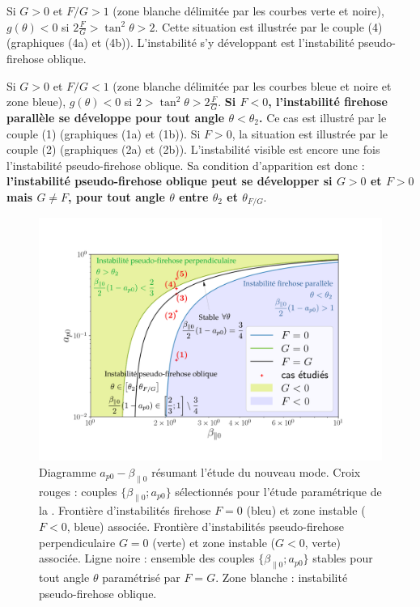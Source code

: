 Si $G>0$ et $F/G>1$ (zone blanche délimitée par les courbes verte et noire), $g(\theta) < 0$ si $2\frac{F}{G} > \tan^2 \theta > 2$. Cette situation est illustrée par le couple (4) (graphiques (4a) et (4b)). L'instabilité s'y développant est l'instabilité pseudo-firehose oblique. 


Si $G>0$ et $F/G<1$ (zone blanche délimitée par les courbes bleue et noire et zone bleue), $g(\theta) < 0$ si $2 > \tan^2 \theta > 2\frac{F}{G}$. {\bf Si $F<0$, l'instabilité firehose parallèle se développe pour tout angle  $\theta < \theta_2$. } Ce cas est illustré par le couple (1) (graphiques (1a) et (1b)). Si $F>0$, la situation est illustrée par le couple (2) (graphiques (2a) et (2b)). L'instabilité visible est encore une fois l'instabilité pseudo-firehose oblique. Sa condition d'apparition est donc : {\bf l'instabilité pseudo-firehose oblique peut se développer si $G>0$ et $F>0$ mais $G\neq F$, pour tout angle $\theta$ entre $\theta_2$ et $\theta_{F/G}$}. 

\begin{figure}[!ht]
 \centering
\includegraphics[width=1\linewidth,trim=2cm 1cm 3cm 2cm, clip=true]{./Part_2/images/diag_cas}
\caption{Diagramme $a_{p0}-\beta_{\parallel 0}$ résumant l'étude du nouveau mode. Croix rouges : couples $\{\beta_{\parallel 0};a_{p0}\}$ sélectionnés pour l'étude paramétrique de la . Frontière d'instabilités firehose $F=0$ (bleu) et zone instable ($F<0$, bleue) associée. Frontière d'instabilités pseudo-firehose perpendiculaire $G=0$ (verte) et zone instable ($G<0$, verte) associée. Ligne noire : ensemble des couples $\{\beta_{\parallel 0};a_{p0}\}$ stables pour tout angle $\theta$ paramétrisé par  $F=G$. Zone blanche : instabilité pseudo-firehose oblique. }
\label{fig:lin_cases_update}
\end{figure}


